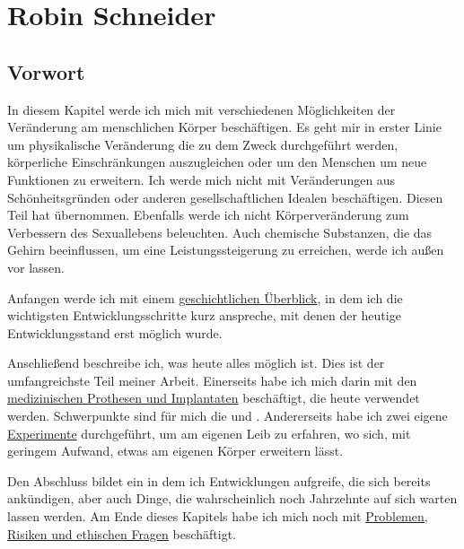 \chapter{Robin Schneider}
\label{sec:Robin_Schneider}


\section{Vorwort}
In diesem Kapitel werde ich mich mit verschiedenen Möglichkeiten der Veränderung am menschlichen Körper beschäftigen.
Es geht mir in erster Linie um physikalische Veränderung die zu dem Zweck durchgeführt werden,
körperliche Einschränkungen auszugleichen oder um den Menschen um neue Funktionen zu erweitern.
Ich werde mich nicht mit Veränderungen aus Schönheitsgründen
oder anderen gesellschaftlichen Idealen beschäftigen.
Diesen Teil hat  übernommen.
Ebenfalls werde ich nicht Körperveränderung zum Verbessern des Sexuallebens beleuchten.
Auch chemische Substanzen, die das Gehirn beeinflussen,
um eine Leistungssteigerung zu erreichen, werde ich außen vor lassen.


\bigskip
Anfangen werde ich mit einem \hyperref[sec:Robin:historical_overview]{geschichtlichen Überblick},
in dem ich die wichtigsten Entwicklungsschritte kurz anspreche, mit denen der heutige
Entwicklungsstand erst möglich wurde.

Anschließend beschreibe ich, was heute alles möglich ist.
Dies ist der umfangreichste Teil meiner Arbeit. Einerseits habe ich mich darin mit den
\hyperref[sec:Robin:topical]{medizinischen Prothesen und Implantaten} beschäftigt, die heute
verwendet werden. Schwerpunkte sind für mich die
 und .
Andererseits habe ich zwei eigene \hyperref[sec:Robin:experiments]{Experimente} durchgeführt, um am
eigenen Leib zu erfahren, wo sich, mit geringem Aufwand, etwas am eigenen Körper erweitern lässt.

Den Abschluss bildet ein  in dem ich Entwicklungen aufgreife, die sich
bereits ankündigen, aber auch Dinge, die wahrscheinlich noch Jahrzehnte auf sich warten lassen
werden. Am Ende dieses Kapitels habe ich mich noch mit
\hyperref[sec:Robin:future:problems]{Problemen,
Risiken und ethischen Fragen} beschäftigt.











\nocite{
	Spektrum:Weg_zu_intelligenten_Prothesen,
	thesis:Cyborg,
	Stern:pacemaker,
	Heise:Telepolis:Mensch:Cyborg,
}



\printbibliography[heading=source,keyword=Robin]

